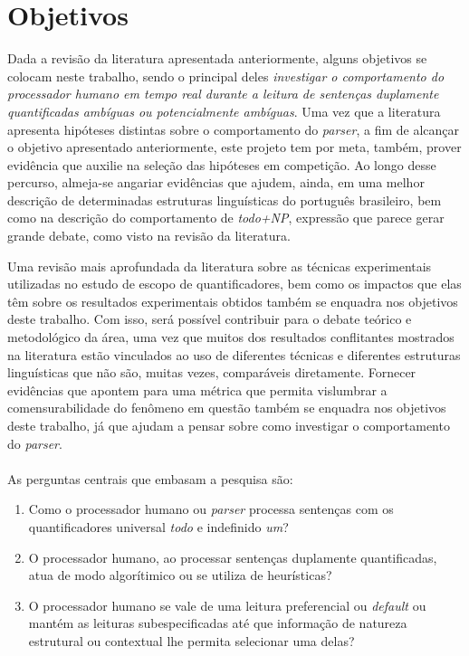 \chapter{Objetivos}
Dada a revisão da literatura apresentada anteriormente, alguns objetivos se colocam neste trabalho, sendo o principal deles \emph{investigar o comportamento do processador humano em tempo real durante a leitura de sentenças duplamente quantificadas ambíguas ou potencialmente ambíguas}. Uma vez que a literatura apresenta hipóteses distintas sobre o comportamento do \emph{parser}, a fim de alcançar o objetivo apresentado anteriormente, este projeto tem por meta, também, prover evidência que auxilie na seleção das hipóteses em competição. Ao longo desse percurso, almeja-se angariar evidências que ajudem, ainda, em uma melhor descrição de determinadas estruturas linguísticas do português brasileiro, bem como na descrição do comportamento de \emph{todo+NP}, expressão que parece gerar grande debate, como visto na revisão da literatura.

Uma revisão mais aprofundada da literatura sobre as técnicas experimentais utilizadas no estudo de escopo de quantificadores, bem como os impactos que elas têm sobre os resultados experimentais obtidos também se enquadra nos objetivos deste trabalho. Com isso, será possível contribuir para o debate teórico e metodológico da área, uma vez que muitos dos resultados conflitantes mostrados na literatura estão vinculados ao uso de diferentes técnicas e diferentes estruturas linguísticas que não são, muitas vezes, comparáveis diretamente. Fornecer evidências que apontem para uma métrica que permita vislumbrar a comensurabilidade do fenômeno em questão também se enquadra nos objetivos deste trabalho, já que ajudam a pensar sobre como investigar o comportamento do \emph{parser}.\\
\\
As perguntas centrais que embasam a pesquisa são:

\begin{enumerate}
  \item Como o processador humano ou \emph{parser} processa sentenças com os quantificadores universal \emph{todo} e indefinido \emph{um}?
  \item O processador humano, ao processar sentenças duplamente quantificadas, atua de modo algorítimico ou se utiliza de heurísticas?
  \item O processador humano se vale de uma leitura preferencial ou \emph{default} ou mantém as leituras subespecificadas até que informação de natureza estrutural ou contextual lhe permita selecionar uma delas?
\end{enumerate}

